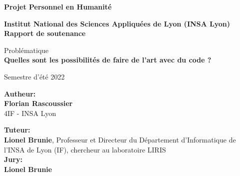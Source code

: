 \begin{titlepage}
    \begin{center}
        \vspace{1cm}
        \Large
        \textbf{Projet Personnel en Humanité}

        \vspace{0.5cm}
        \normalsize
        \textbf{Institut National des Sciences Appliquées de Lyon (INSA Lyon)}\\

        \vspace{2cm}
        \Huge
        \textbf{Rapport de soutenance}

        \vspace{2cm}
        \Large
        Problématique\\
        \textbf{Quelles sont les possibilités de faire de l'art avec du code ?}


        \vspace{1cm}
        \normalsize
        Semestre d'été 2022
        
        \vspace{2cm}

        \vfill

        \Large
        \textbf{Autheur:}\\
        \vspace{0.5cm}
        \normalsize
        \textbf{Florian Rascoussier}\\
        4IF - INSA Lyon

        \vspace{1cm}
        \Large
        \textbf{Tuteur:}\\
        \vspace{0.5cm}
        \normalsize
        \textbf{Lionel Brunie}, Professeur et Directeur du Département d'Informatique de l'INSA de Lyon (IF), chercheur au laboratoire LIRIS\\

        \vspace{1cm}
        \Large
        \textbf{Jury:}\\
        \vspace{0.5cm}
        \normalsize
        \textbf{Lionel Brunie}
            
    \end{center}
\end{titlepage}